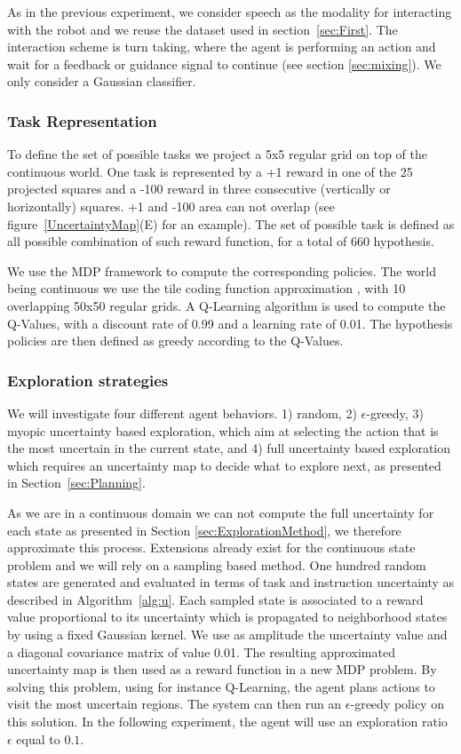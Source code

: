 As in the previous experiment, we consider speech as the modality for interacting with the robot and we reuse the dataset used in section~\ref{sec:First}. The interaction scheme is turn taking, where the agent is performing an action and wait for a feedback or guidance signal to continue (see section \ref{sec:mixing}). We only consider a Gaussian classifier.

\subsubsection{Task Representation}
To define the set of possible tasks we project a 5x5 regular grid on top of the continuous world. One task is represented by a +1 reward in one of the 25 projected squares and a -100 reward in three consecutive (vertically or horizontally) squares. +1 and -100 area can not overlap (see figure~\ref{UncertaintyMap}(E) for an example). The set of possible task is defined as all possible combination of such reward function, for a total of 660 hypothesis. 

We use the MDP framework to compute the corresponding policies. The world being continuous we use the tile coding function approximation \cite{sutton1998reinforcement}, with 10 overlapping 50x50 regular grids. %
A Q-Learning algorithm \cite{watkins1992q} is used to compute the Q-Values, with a discount rate of 0.99 and a learning rate of 0.01. The hypothesis policies are then defined as greedy according to the Q-Values.

\subsubsection{Exploration strategies}

We will investigate four different agent behaviors. 1) random, 2) $\epsilon$-greedy, 3) myopic uncertainty based exploration, which aim at selecting the action that is the most uncertain in the current state, and 4) full uncertainty based exploration which requires an uncertainty map to decide what to explore next, as presented in Section~\ref{sec:Planning}. 

As we are in a continuous domain we can not compute the full uncertainty for each state as presented in Section \ref{sec:ExplorationMethod}, we therefore approximate this process. Extensions already exist for the continuous state problem \cite{nouri2010dimension,Hester13aamas} and we will rely on a sampling based method. One hundred random states are generated and evaluated in terms of task and instruction uncertainty as described in Algorithm~\ref{alg:u}. Each sampled state is associated to a reward value proportional to its uncertainty which is propagated to neighborhood states by using a fixed Gaussian kernel. We use as amplitude the uncertainty value and a diagonal covariance matrix of value 0.01. The resulting approximated uncertainty map is then used as a reward function in a new MDP problem. By solving this problem, using for instance Q-Learning, the agent plans actions to visit the most uncertain regions. The system can then run an $\epsilon$-greedy policy on this solution. In the following experiment, the agent will use an exploration ratio $\epsilon$ equal to $0.1$.

